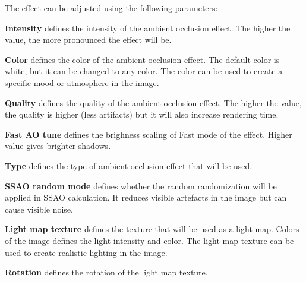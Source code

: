 The effect can be adjusted using the following parameters:

\textbf{Intensity} defines the intensity of the ambient occlusion effect. The higher the value, the more pronounced the effect will be.

\textbf{Color} defines the color of the ambient occlusion effect. The default color is white, but it can be changed to any color. The color can be used to create a specific mood or atmosphere in the image.

\textbf{Quality} defines the quality of the ambient occlusion effect. The higher the value, the quality is higher (less artifacts) but it will also increase rendering time.

\textbf{Fast AO tune} defines the brighness scaling of Fast mode of the effect. Higher value gives brighter shadows.

\textbf{Type} defines the type of ambient occlusion effect that will be used.

\textbf{SSAO random mode} defines whether the random randomization will be applied in SSAO calculation. It reduces visible artefacts in the image but can cause visible noise.

\textbf{Light map texture} defines the texture that will be used as a light map. Colors of the image defines the light intensity and color. The light map texture can be used to create realistic lighting in the image. 

\textbf{Rotation} defines the rotation of the light map texture.

